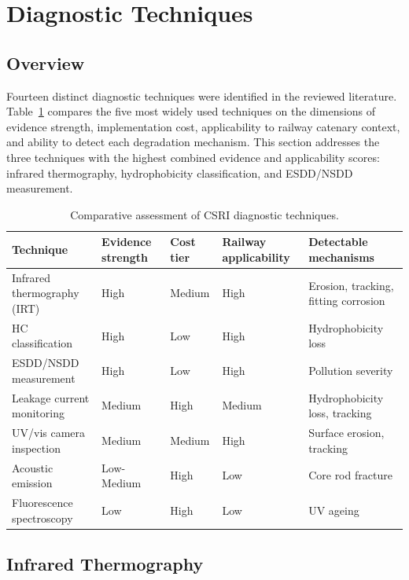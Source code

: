 \documentclass[preprint,12pt,3p]{elsarticle}
\begin{document}
\section{Diagnostic Techniques}
\label{sec:diagnosis}

\subsection{Overview}

Fourteen distinct diagnostic techniques were identified in the reviewed
literature. Table~\ref{tab:diagnostic} compares the five most widely
used techniques on the dimensions of evidence strength, implementation
cost, applicability to railway catenary context, and ability to detect
each degradation mechanism. This section addresses the three techniques
with the highest combined evidence and applicability scores: infrared
thermography, hydrophobicity classification, and ESDD/NSDD measurement.

\begin{table}[h]
\centering
\caption{Comparative assessment of CSRI diagnostic techniques.}
\label{tab:diagnostic}
\begin{tabular}{p{3.5cm} p{2cm} p{2cm} p{2cm} p{2.5cm}}
\toprule
\textbf{Technique} & \textbf{Evidence strength} & \textbf{Cost tier} &
\textbf{Railway applicability} & \textbf{Detectable mechanisms} \\
\midrule
Infrared thermography (IRT) & High & Medium & High & Erosion, tracking,
fitting corrosion \\
HC classification & High & Low & High & Hydrophobicity loss \\
ESDD/NSDD measurement & High & Low & High & Pollution severity \\
Leakage current monitoring & Medium & High & Medium & Hydrophobicity loss,
tracking \\
UV/vis camera inspection & Medium & Medium & High & Surface erosion,
tracking \\
Acoustic emission & Low-Medium & High & Low & Core rod fracture \\
Fluorescence spectroscopy & Low & High & Low & UV ageing \\
\bottomrule
\end{tabular}
\end{table}

\subsection{Infrared Thermography}
\end{document}
